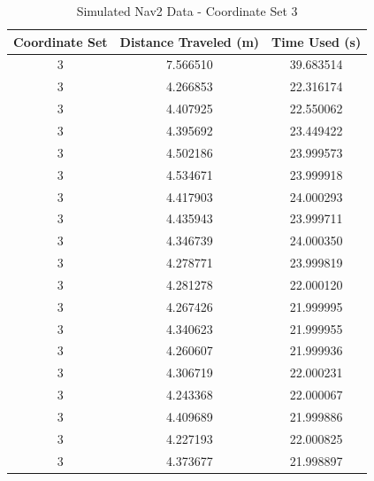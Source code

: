 \documentclass[%
paper=A4,               %
twoside=true,           %
openright,              %
11pt,                   %
bibliography=totoc,     %
titlepage=on,           %
DIV=12,                 %
BCOR=1.5cm,             %
parskip=half,            %
final
]{scrreprt}
\begin{document}
	\begin{table}[h!]
		\centering
		\begin{tabular}{|c|c|c|}
			\hline
			Coordinate Set & Distance Traveled (m) & Time Used (s) \\
			\hline
			3 & 7.566510 & 39.683514 \\
			3 & 4.266853 & 22.316174 \\
			3 & 4.407925 & 22.550062 \\
			3 & 4.395692 & 23.449422 \\
			3 & 4.502186 & 23.999573 \\
			3 & 4.534671 & 23.999918 \\
			3 & 4.417903 & 24.000293 \\
			3 & 4.435943 & 23.999711 \\
			3 & 4.346739 & 24.000350 \\
			3 & 4.278771 & 23.999819 \\
			3 & 4.281278 & 22.000120 \\
			3 & 4.267426 & 21.999995 \\
			3 & 4.340623 & 21.999955 \\
			3 & 4.260607 & 21.999936 \\
			3 & 4.306719 & 22.000231 \\
			3 & 4.243368 & 22.000067 \\
			3 & 4.409689 & 21.999886 \\
			3 & 4.227193 & 22.000825 \\
			3 & 4.373677 & 21.998897 \\
			\hline
		\end{tabular}
		\caption{Simulated Nav2 Data - Coordinate Set 3}
		\label{tab:4}
	\end{table}
	
\end{document}
